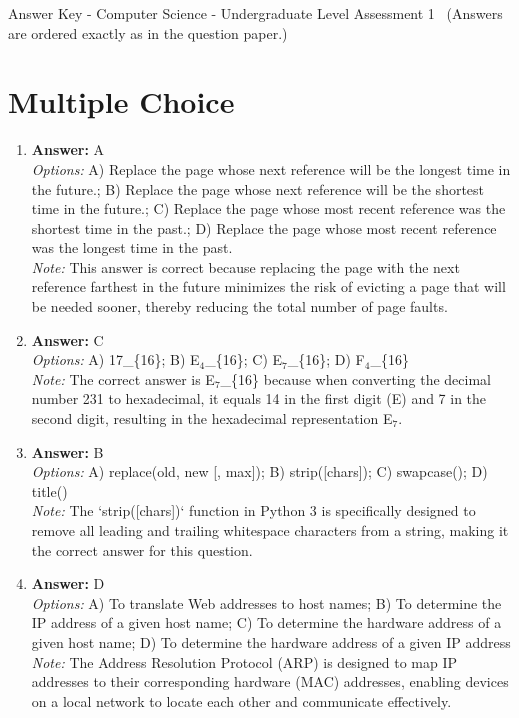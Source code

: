 \documentclass[12pt]{article}
\begin{document}
\begin{center}
Answer Key - Computer Science - Undergraduate Level Assessment 1 \
\small (Answers are ordered exactly as in the question paper.)
\end{center}

\section*{Multiple Choice}
\begin{enumerate}[label=\arabic*.]
\item \textbf{Answer:} A
\\ \textit{Options:} A) Replace the page whose next reference will be the longest time in the future.; B) Replace the page whose next reference will be the shortest time in the future.; C) Replace the page whose most recent reference was the shortest time in the past.; D) Replace the page whose most recent reference was the longest time in the past.
\\ \textit{Note:} This answer is correct because replacing the page with the next reference farthest in the future minimizes the risk of evicting a page that will be needed sooner, thereby reducing the total number of page faults.
\item \textbf{Answer:} C
\\ \textit{Options:} A) 17\_\{16\}; B) E$_{4}$\_\{16\}; C) E$_{7}$\_\{16\}; D) F$_{4}$\_\{16\}
\\ \textit{Note:} The correct answer is E$_{7}$\_\{16\} because when converting the decimal number 231 to hexadecimal, it equals 14 in the first digit (E) and 7 in the second digit, resulting in the hexadecimal representation E$_{7}$.
\item \textbf{Answer:} B
\\ \textit{Options:} A) replace(old, new [, max]); B) strip([chars]); C) swapcase(); D) title()
\\ \textit{Note:} The `strip([chars])` function in Python 3 is specifically designed to remove all leading and trailing whitespace characters from a string, making it the correct answer for this question.
\item \textbf{Answer:} D
\\ \textit{Options:} A) To translate Web addresses to host names; B) To determine the IP address of a given host name; C) To determine the hardware address of a given host name; D) To determine the hardware address of a given IP address
\\ \textit{Note:} The Address Resolution Protocol (ARP) is designed to map IP addresses to their corresponding hardware (MAC) addresses, enabling devices on a local network to locate each other and communicate effectively.

\end{enumerate}
\end{document}
